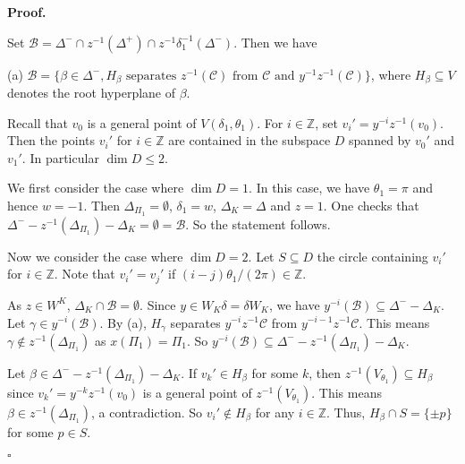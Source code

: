 \documentclass[12pt,leqno]{article}
\newcommand{\qed}{\hfill $\square$ \medskip}
\newenvironment{proof}[1][Proof]{\noindent\textbf{#1.} }{\qed}
\newcommand{\caC}{\mathcal C}
\newcommand{\g}{\mathfrak g}
\def\le{\leqslant}
\def\b{\beta}
\def\g{\gamma}
\def\d{\delta}
\def\D{\Delta}
\def\th{\theta}
\def\i{^{-1}}
\begin{document}
\begin{proof}
	
   Set $\mathcal B= \D^- \cap z \i(\D^+) \cap z \i \d_1 \i(\D^-)$. Then we have
	
	(a) $\mathcal B=\{\b \in \D^-, H_\b \text{ separates $z^{-1}(\caC)$ from $\caC$ and $y^{-1} z^{-1}(\caC)$}\}$, where $H_\b \subseteq V$ denotes the root hyperplane of $\b$.
	
	Recall that $v_0$ is a general point of $V(\d_1, \th_1)$. For $i \in \mathbb Z$, set $v_i'=y^{-i} z^{-1} (v_0)$. Then the points $v_i'$ for $i \in \mathbb Z$ are contained in the subspace $D$ spanned by $v_0'$ and $v_1'$. In particular $\dim D \le 2$.
	
	We first consider the case where $\dim D=1$. In this case, we have $\th_1 = \pi$ and hence $w=-1$. Then $\D_{\Pi_1} = \emptyset$, $\d_1 = w$, $\D_K = \D$ and $z=1$. One checks that $\D^- - z \i(\D_{\Pi_1})-\D_K = \emptyset = \mathcal B$. So the statement follows.
	
	Now we consider the case where $\dim D=2$. Let $S \subseteq D$ the circle containing $v_i'$ for $i \in \mathbb Z$. Note that $v_i'=v_j'$ if $(i-j)\th_1/(2\pi) \in \mathbb Z$.
	
	As $z \in W^K$, $\D_K \cap \mathcal B = \emptyset$. Since $y \in W_K \d =\d W_K$, we have $y^{-i}(\mathcal B) \subseteq \D^- - \D_K$. Let $\g \in y^{-i}(\mathcal B)$. By (a), $H_\g$ separates $y^{-i} z^{-1} \caC$ from $y^{-i-1} z^{-1} \caC$. This means $\g \notin z^{-1}(\D_{\Pi_1})$ as $x(\Pi_1)=\Pi_1$. So $y^{-i}(\mathcal B) \subseteq \D^- - z^{-1}(\D_{\Pi_1}) -\D_K$.
	
	Let $\b \in \D^- - z^{-1}(\D_{\Pi_1}) -\D_K$. If $v_k' \in H_\b$ for some $k$, then $z^{-1}(V_{\th_1}) \subseteq H_\b$ since $v_k'=y^{-k} z^{-1}(v_0)$ is a general point of $z^{-1}(V_{\th_1})$. This means $\b \in z^{-1}(\D_{\Pi_1})$, a contradiction. So $v_i' \notin H_\b$ for any $i \in \mathbb Z$. Thus, $H_\b \cap S = \{\pm p\}$ for some $p \in S$.
	

\end{proof}
\end{document}
